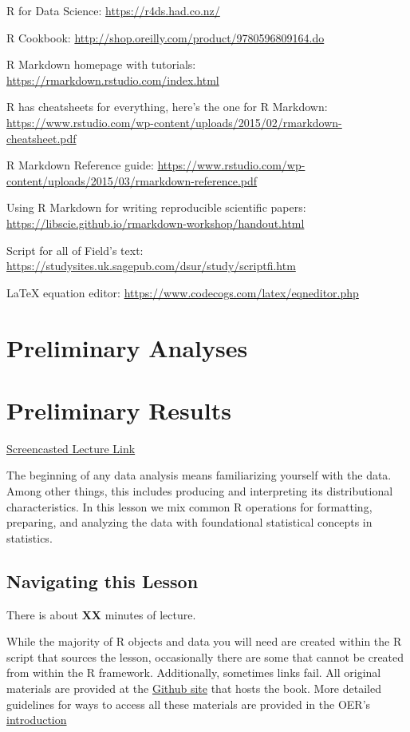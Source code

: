 \documentclass[
  11pt,
]{book}
\begin{document}
R for Data Science: \url{https://r4ds.had.co.nz/}

R Cookbook: \url{http://shop.oreilly.com/product/9780596809164.do}

R Markdown homepage with tutorials: \url{https://rmarkdown.rstudio.com/index.html}

R has cheatsheets for everything, here's the one for R Markdown: \url{https://www.rstudio.com/wp-content/uploads/2015/02/rmarkdown-cheatsheet.pdf}

R Markdown Reference guide: \url{https://www.rstudio.com/wp-content/uploads/2015/03/rmarkdown-reference.pdf}

Using R Markdown for writing reproducible scientific papers: \url{https://libscie.github.io/rmarkdown-workshop/handout.html}

Script for all of Field's text: \url{https://studysites.uk.sagepub.com/dsur/study/scriptfi.htm}

LaTeX equation editor: \url{https://www.codecogs.com/latex/eqneditor.php}

\hypertarget{preliminary-analyses}{%
\chapter*{Preliminary Analyses}\label{preliminary-analyses}}

\hypertarget{preliminaries}{%
\chapter{Preliminary Results}\label{preliminaries}}

\href{}{Screencasted Lecture Link}

The beginning of any data analysis means familiarizing yourself with the data. Among other things, this includes producing and interpreting its distributional characteristics. In this lesson we mix common R operations for formatting, preparing, and analyzing the data with foundational statistical concepts in statistics.

\hypertarget{navigating-this-lesson-1}{%
\section{Navigating this Lesson}\label{navigating-this-lesson-1}}

There is about \textbf{XX} minutes of lecture.

While the majority of R objects and data you will need are created within the R script that sources the lesson, occasionally there are some that cannot be created from within the R framework. Additionally, sometimes links fail. All original materials are provided at the \href{https://github.com/lhbikos/ReCenterPsychStats}{Github site} that hosts the book. More detailed guidelines for ways to access all these materials are provided in the OER's \protect\hyperlink{ReCintro}{introduction}
\end{document}
